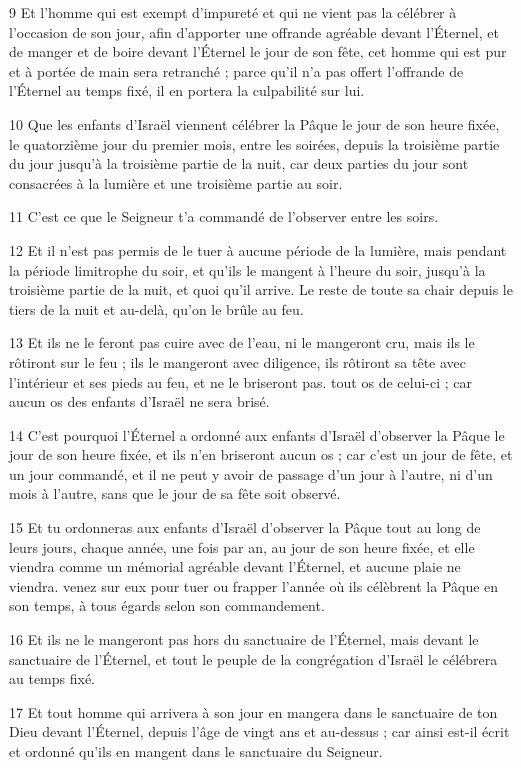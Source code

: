 \par 9 Et l'homme qui est exempt d'impureté et qui ne vient pas la célébrer à l'occasion de son jour, afin d'apporter une offrande agréable devant l'Éternel, et de manger et de boire devant l'Éternel le jour de son fête, cet homme qui est pur et à portée de main sera retranché ; parce qu'il n'a pas offert l'offrande de l'Éternel au temps fixé, il en portera la culpabilité sur lui.
\par 10 Que les enfants d'Israël viennent célébrer la Pâque le jour de son heure fixée, le quatorzième jour du premier mois, entre les soirées, depuis la troisième partie du jour jusqu'à la troisième partie de la nuit, car deux parties du jour sont consacrées à la lumière et une troisième partie au soir.
\par 11 C'est ce que le Seigneur t'a commandé de l'observer entre les soirs.
\par 12 Et il n'est pas permis de le tuer à aucune période de la lumière, mais pendant la période limitrophe du soir, et qu'ils le mangent à l'heure du soir, jusqu'à la troisième partie de la nuit, et quoi qu'il arrive. Le reste de toute sa chair depuis le tiers de la nuit et au-delà, qu'on le brûle au feu.
\par 13 Et ils ne le feront pas cuire avec de l'eau, ni le mangeront cru, mais ils le rôtiront sur le feu ; ils le mangeront avec diligence, ils rôtiront sa tête avec l'intérieur et ses pieds au feu, et ne le briseront pas. tout os de celui-ci ; car aucun os des enfants d’Israël ne sera brisé.
\par 14 C'est pourquoi l'Éternel a ordonné aux enfants d'Israël d'observer la Pâque le jour de son heure fixée, et ils n'en briseront aucun os ; car c'est un jour de fête, et un jour commandé, et il ne peut y avoir de passage d'un jour à l'autre, ni d'un mois à l'autre, sans que le jour de sa fête soit observé.
\par 15 Et tu ordonneras aux enfants d'Israël d'observer la Pâque tout au long de leurs jours, chaque année, une fois par an, au jour de son heure fixée, et elle viendra comme un mémorial agréable devant l'Éternel, et aucune plaie ne viendra. venez sur eux pour tuer ou frapper l'année où ils célèbrent la Pâque en son temps, à tous égards selon son commandement.
\par 16 Et ils ne le mangeront pas hors du sanctuaire de l'Éternel, mais devant le sanctuaire de l'Éternel, et tout le peuple de la congrégation d'Israël le célébrera au temps fixé.
\par 17 Et tout homme qui arrivera à son jour en mangera dans le sanctuaire de ton Dieu devant l'Éternel, depuis l'âge de vingt ans et au-dessus ; car ainsi est-il écrit et ordonné qu'ils en mangent dans le sanctuaire du Seigneur.
